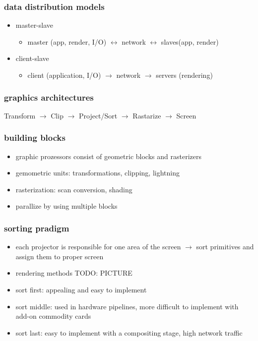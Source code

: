\documentclass[11pt,a4paper]{article}
\begin{document}
\subsubsection{data distribution models}
\begin{itemize}
	\item master-slave
	\begin{itemize}
		\item master (app, render, I/O) $\leftrightarrow$ network $\leftrightarrow$ slaves(app, render)
	\end{itemize}
	\item client-slave
	\begin{itemize}
		\item client (application, I/O) $\rightarrow$ network $\rightarrow$ servers (rendering)
	\end{itemize}
\end{itemize}
\subsubsection{graphics architectures}
Transform $\rightarrow$ Clip  $\rightarrow$ Project/Sort  $\rightarrow$ Rastarize  $\rightarrow$ Screen
\subsubsection{building blocks}
\begin{itemize}
	\item graphic prozessors consist of geometric blocks and rasterizers
	\item gemometric units: transformations, clipping, lightning
	\item rasterization: scan conversion, shading
	\item parallize by using multiple blocks
\end{itemize}
\subsubsection{sorting pradigm}
\begin{itemize}
	\item each projector is responsible for one area of the screen $\rightarrow$ sort primitives and assign them to proper screen	
	\item rendering methods TODO: PICTURE
	\item sort first: appealing and easy to implement
	\item sort middle: used in hardware pipelines, more difficult to implement with add-on commodity cards
	\item sort last: easy to implement with a compositing stage, high network traffic
\end{itemize}
\end{document}
